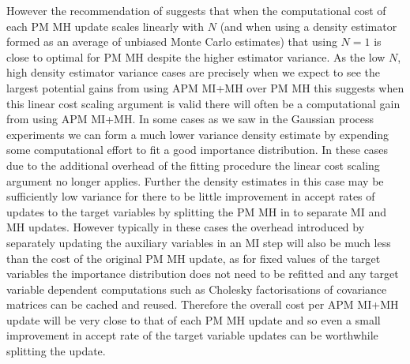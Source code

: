However the recommendation of \citep{sherlock2016pseudo} suggests that when the computational cost of each \ac{PM} \ac{MH} update scales linearly with $N$ (and when using a density estimator formed as an average of unbiased Monte Carlo estimates) that using $N=1$ is close to optimal for \ac{PM} \ac{MH} despite the higher estimator variance. As the low $N$, high density estimator variance cases are precisely when we expect to see the largest potential gains from using \ac{APM} \ac{MI}+\ac{MH} over \ac{PM} \ac{MH} this suggests when this linear cost scaling argument is valid there will often be a computational gain from using \ac{APM} \ac{MI}+\ac{MH}. In some cases as we saw in the Gaussian process experiments we can form a much lower variance density estimate by expending some computational effort to fit a good importance distribution. In these cases due to the additional overhead of the fitting procedure the linear cost scaling argument no longer applies. Further the density estimates in this case may be sufficiently low variance for there to be little improvement in accept rates of updates to the target variables by splitting the \ac{PM} \ac{MH} in to separate \ac{MI} and \ac{MH} updates. However typically in these cases the overhead introduced by separately updating the auxiliary variables in an \ac{MI} step will also be much less than the cost of the original \ac{PM} \ac{MH} update, as for fixed values of the target variables the importance distribution does not need to be refitted and any target variable dependent computations such as Cholesky factorisations of covariance matrices can be cached and reused. Therefore the overall cost per \ac{APM} \ac{MI}+\ac{MH} update will be very close to that of each \ac{PM} \ac{MH} update and so even a small improvement in accept rate of the target variable updates can be worthwhile splitting the update.

